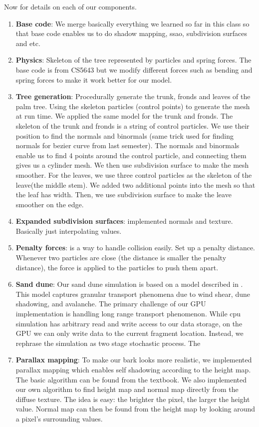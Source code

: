 \documentclass[annual]{acmsiggraph}
\begin{document}
Now for details on each of our components.
\begin{enumerate}
\item{\textbf{Base code}: We merge basically everything we learned so far in this class so that base code enables us to do shadow mapping, ssao, subdivision surfaces and etc.}
\item{\textbf{Physics}: Skeleton of the tree represented by particles and spring forces. The base code is from CS5643 but we modify different forces such as bending and spring forces to make it work better for our model.}
\item{\textbf{Tree generation}: Procedurally generate the trunk, fronds and leaves of the palm tree. Using the skeleton particles (control points) to generate the mesh at run time. We applied the same model for the trunk and fronds. The skeleton of the trunk and fronds is a string of control particles. We use their position to find the normals and binormals (same trick used for finding normals for bezier curve from last semester). The normals and binormals enable us to find 4 points around the control particle, and connecting them gives us a cylinder mesh. We then use subdivision surface to make the mesh smoother. For the leaves, we use three control particles as the skeleton of the leave(the middle stem). We added two additional points into the mesh so that the leaf has width. Then, we use subdivision surface to make the leave smoother on the edge.}
\item{\textbf{Expanded subdivision surfaces}: implemented normals and texture. Basically just interpolating values.}
\item{\textbf{Penalty forces}: is a way to handle collision easily. Set up a penalty distance. Whenever two particles are close (the distance is smaller the penalty distance), the force is applied to the particles to push them apart.}
\item{\textbf{Sand dune}: Our sand dune simulation is based on a model described in  \cite{momiji2002}.  This model captures granular transport phenomena due to wind shear, dune shadowing, and avalanche.  The primary challenge of our GPU implementation is handling long range transport phenomenon.  While cpu simulation has arbitrary read and write access to our data storage, on the GPU we can only write data to the current fragment location.  Instead, we rephrase the simulation as two stage stochastic process.  The    }
\item{\textbf{Parallax mapping}: To make our bark looks more realistic, we implemented parallax mapping which enables self shadowing according to the height map. The basic algorithm can be found from the textbook. We also implemented our own algorithm to find height map and normal map directly from the diffuse texture. The idea is easy: the brighter the pixel, the larger the height value. Normal map can then be found from the height map by looking around a pixel's surrounding values.}

\end{enumerate}
\end{document}
